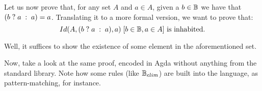 Let us now prove that, for any set $A$ and $a \in A$, given a $b \in \BB$ we have
that $\ite{b}{a}{a} = a$. Translating it to a more formal version, we want to prove that:
\[
  \withhip{b \in \BB, a \in A}{Id(A, \ite{b}{a}{a}, a)} \text{ is inhabited.}
\]

Well, it suffices to show the existence of some element in the aforementioned set.



Now, take a look at the same proof, encoded in Agda without anything from the standard library.
Note how some rules (like $\BB_{elim}$) are built into the language, as pattern-matching, for instance.



